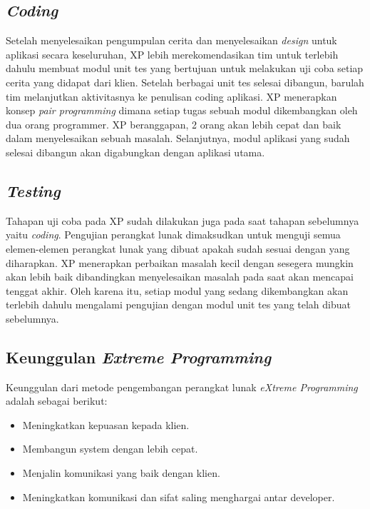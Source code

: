 \subsection{\emph{Coding}}
\par Setelah menyelesaikan pengumpulan cerita dan menyelesaikan \textit{design} untuk aplikasi secara keseluruhan, XP lebih merekomendasikan tim untuk terlebih dahulu membuat modul unit tes yang bertujuan untuk melakukan uji coba setiap cerita yang didapat dari klien. Setelah berbagai unit tes selesai dibangun, barulah tim melanjutkan aktivitasnya ke penulisan coding aplikasi. XP menerapkan konsep \textit{pair programming} dimana setiap tugas sebuah modul dikembangkan oleh dua orang programmer. XP beranggapan, 2 orang akan lebih cepat dan baik dalam menyelesaikan sebuah masalah. Selanjutnya, modul aplikasi yang sudah selesai dibangun akan digabungkan dengan aplikasi utama.

\subsection{\emph{Testing}}
\par Tahapan uji coba pada XP sudah dilakukan juga pada saat tahapan sebelumnya yaitu \textit{coding}. Pengujian perangkat lunak dimaksudkan untuk menguji semua elemen-elemen perangkat lunak yang dibuat apakah sudah sesuai dengan yang diharapkan. XP menerapkan perbaikan masalah kecil dengan sesegera mungkin akan lebih baik dibandingkan menyelesaikan masalah pada saat akan mencapai tenggat akhir. Oleh karena itu, setiap modul yang sedang dikembangkan akan terlebih dahulu mengalami pengujian dengan modul unit tes yang telah dibuat sebelumnya.

\subsection{Keunggulan \textit{Extreme Programming}}
\par Keunggulan dari metode pengembangan perangkat lunak \textit{eXtreme Programming} adalah sebagai berikut: \citep{Michael}
\begin{itemize}
	\itemsep0em
	\item Meningkatkan kepuasan kepada klien.
	\item Membangun system dengan lebih cepat.
	\item Menjalin komunikasi yang baik dengan klien.
	\item Meningkatkan komunikasi dan sifat saling menghargai antar developer.
\end{itemize}

